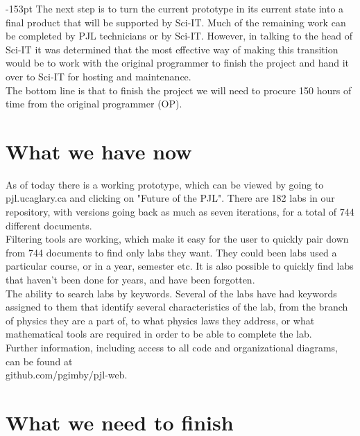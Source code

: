 \begin{adjustwidth}{}{-153pt}
The next step is to turn the current prototype in its current state into a final product that will be supported by Sci-IT. Much of the remaining work can be completed by PJL technicians or by Sci-IT. However, in talking to the head of Sci-IT it was determined that the most effective way of making this transition would be to work with the original programmer to finish the project and hand it over to Sci-IT for hosting and maintenance.\\ 

The bottom line is that to finish the project we will need to procure 150 hours of time from the original programmer (OP). 


\section{\bf What we have now}
As of today there is a working prototype, which can be viewed by going to pjl.ucaglary.ca and clicking on "Future of the PJL". There are 182 labs in our repository, with versions going back as much as seven iterations, for a total of 744 different documents. \\

Filtering tools are working, which make it easy for the user to quickly pair down from 744 documents to find only labs they want. They could been labs used a particular course, or in a year, semester etc. It is also possible to quickly find labs that haven't been done for years, and have been forgotten. \\

The ability to search labs by keywords. Several of the labs have had keywords assigned to them that identify several characteristics of the lab, from the branch of physics they are a part of, to what physics laws they address, or what mathematical tools are required in order to be able to complete the lab.\\

Further information, including access to all code and organizational diagrams, can be found at\\ github.com/pgimby/pjl-web.


\section{\bf What we need to finish}


\end{adjustwidth}
